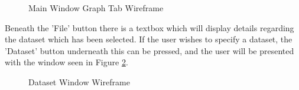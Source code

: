 \documentclass[12pt,a4paper]{article}
\begin{document}
\begin{figure}[H]
\caption{Main Window Graph Tab Wireframe}
\label{graphwf}
\end{figure}

Beneath the 'File' button there is a textbox which will display details regarding the dataset which has been selected. If the user wishes to specify a dataset, the 'Dataset' button underneath this can be pressed, and the user will be presented with the window seen in Figure \ref{datasetwf}.

\begin{figure}[H]
\caption{Dataset Window Wireframe}
\label{datasetwf}
\end{figure}
\end{document}
